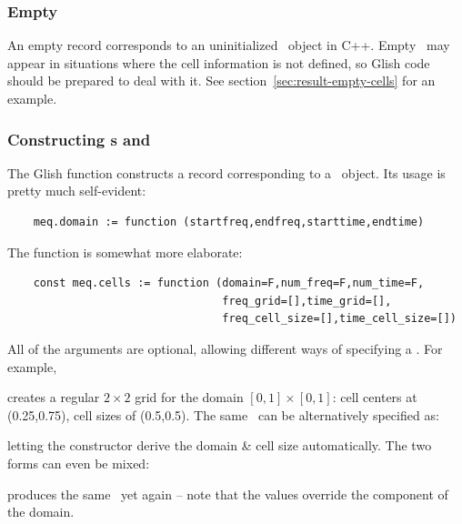 \subsubsection{Empty \Cells{}}

  An empty record corresponds to an uninitialized \Cells\ object in C++. Empty
  \Cells\ may appear in situations where the cell information is not defined,
  so Glish code should be prepared to deal with it. See
  section~\ref{sec:result-empty-cells} for an example.
  
  
\subsubsection{Constructing \Domain{}s and \Cells{}}

  The Glish  function constructs a record corresponding to
  a \Domain\ object. Its usage is pretty much self-evident:
  
  \begin{verbatim}
    meq.domain := function (startfreq,endfreq,starttime,endtime)
  \end{verbatim}
  
  The  function is somewhat more elaborate:
  
  \begin{verbatim}
    const meq.cells := function (domain=F,num_freq=F,num_time=F,
                                 freq_grid=[],time_grid=[],
                                 freq_cell_size=[],time_cell_size=[])
  \end{verbatim}

  All of the arguments are optional, allowing different ways of specifying 
  a \Cells. For example,
  
  
  creates a regular $2\times 2$ grid for the domain $[0,1]\times[0,1]$: cell
  centers at (0.25,0.75), cell sizes of (0.5,0.5). The same \Cells\ can be
  alternatively specified as:
  
  
  letting the constructor derive the domain \& cell size automatically. The
  two forms can even be mixed:
  
  
  produces the same \Cells\ yet again -- note that the  
  values override the  component of the domain.
  
